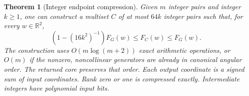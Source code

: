 \documentclass[11pt]{article}
\newtheorem{theorem}{Theorem}
\begin{document}
\begin{theorem}[Integer endpoint compression]\label{thm:planar}
Given $m$ integer pairs and integer $k\geq1$, one can construct a multiset
$C$ of at most $64k$ integer pairs such that, for every $w\in\mathbb R^2$,
\begin{equation}\label{eq:core}
 (1-(16k^2)^{-1})F_G(w)\leq F_C(w)\leq F_G(w).
\end{equation}
The construction uses $O(m\log(m+2))$ exact arithmetic operations, or
$O(m)$ if the nonzero, noncollinear generators are already in canonical
angular order. The returned core preserves that order.
Each output coordinate is a signed sum of input coordinates. Rank zero or
one is compressed exactly. Intermediate integers have polynomial input bits.
\end{theorem}
\end{document}
